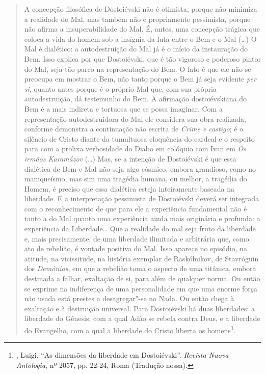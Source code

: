 \begin{quote}
A concepção filosófica de Dostoiévski não é otimista, porque não
minimiza a realidade do Mal, mas também não é propriamente pessimista,
porque não afirma a insuperabilidade do Mal. É, antes, uma concepção
trágica que coloca a vida do homem sob a insígnia da luta entre o Bem e
o Mal (\ldots{}) O Mal é dialético: a autodestruição do Mal já é o início da
instauração do Bem. Isso explica por que Dostoiévski, que é tão vigoroso
e poderoso pintor do Mal, seja tão parco na representação do Bem. O fato
é que ele não se preocupa em mostrar o Bem, não tanto porque o Bem já
seja evidente \emph{per si}, quanto antes porque é o próprio Mal que,
com sua própria autodestruição, dá testemunho do Bem. A afirmação
dostoiévskiana do Bem é a mais indireta e tortuosa que se possa
imaginar. Com a representação autodestruidora do Mal ele considera sua
obra realizada, conforme demonstra a continuação não escrita de
\emph{Crime e castigo}; é o silêncio de Cristo diante da tumultuosa
eloquência do cardeal e o respeito para com a prolixa verbosidade do
Diabo em colóquio com Ivan em \emph{Os irmãos Karamázov} (\ldots{}) Mas, se a
intenção de Dostoiévski é que essa dialética de Bem e Mal não seja algo
cósmico, embora grandioso, como no maniqueísmo, mas sim uma tragédia
humana, ou melhor, a tragédia do Homem, é preciso que essa dialética
esteja inteiramente baseada na liberdade. E a interpretação pessimista
de Dostoiévski deverá ser integrada com o reconhecimento de que para ele
a experiência fundamental não é tanto a do Mal quanto uma experiência
ainda mais originária e profunda: a experiência da Liberdade\ldots{} Que a
realidade do mal seja fruto da liberdade e, mais precisamente, de uma
liberdade ilimitada e arbitrária que, como ato de rebelião, é vontade
positiva do Mal. Isso aparece no episódio, na atitude, na vicissitude,
na história exemplar de Raskólnikov, de Stavróguin dos \emph{Demônios},
em que a rebelião toma o aspecto de uma titânica, embora destinada a
falhar, exaltação de si, para além de qualquer norma. Ou então se
exprime na indiferença de uma personalidade em que uma enorme força não
usada está prestes a desagregar"-se no Nada. Ou então chega à exaltação e
à destruição universal. Para Dostoiévski há duas liberdades: a liberdade
do Gênesis, com a qual Adão se rebela contra Deus, e a liberdade do
Evangelho, com a qual a liberdade do Cristo liberta os homens\footnote{,
  Luigi. ``As dimensões da liberdade em Dostoiévski''. \emph{Revista Nuova
  Antologia}, nº 2057, pp. 22-24, Roma (Tradução nossa).}.
\end{quote}

